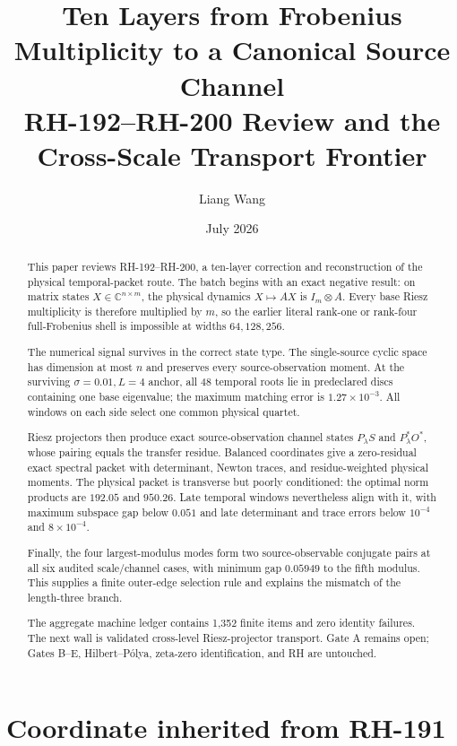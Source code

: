 \documentclass[12pt]{article}
\title{Ten Layers from Frobenius Multiplicity to a Canonical Source Channel\\
\large RH-192--RH-200 Review and the Cross-Scale Transport Frontier}
\author{Liang Wang}
\date{July 2026}
\theoremstyle{remark}
\begin{document}
\maketitle

\begin{abstract}
This paper reviews RH-192--RH-200, a ten-layer correction and reconstruction
of the physical temporal-packet route.  The batch begins with an exact
negative result: on matrix states $X\in\mathbb C^{n\times m}$, the physical
dynamics $X\mapsto AX$ is $I_m\otimes A$.  Every base Riesz multiplicity is
therefore multiplied by $m$, so the earlier literal rank-one or rank-four
full-Frobenius shell is impossible at widths $64,128,256$.

The numerical signal survives in the correct state type.  The single-source
cyclic space has dimension at most $n$ and preserves every
source-observation moment.  At the surviving $\sigma=0.01,L=4$ anchor, all
48 temporal roots lie in predeclared discs containing one base eigenvalue;
the maximum matching error is $1.27\times10^{-3}$.  All windows on each side
select one common physical quartet.

Riesz projectors then produce exact source-observation channel states
$P_\lambda S$ and $P_\lambda^*O^*$, whose pairing equals the transfer
residue.  Balanced coordinates give a zero-residual exact spectral packet
with determinant, Newton traces, and residue-weighted physical moments.
The physical packet is transverse but poorly conditioned: the optimal norm
products are $192.05$ and $950.26$.  Late temporal windows nevertheless
align with it, with maximum subspace gap below $0.051$ and late determinant
and trace errors below $10^{-4}$ and $8\times10^{-4}$.

Finally, the four largest-modulus modes form two source-observable conjugate
pairs at all six audited scale/channel cases, with minimum gap $0.05949$ to
the fifth modulus.  This supplies a finite outer-edge selection rule and
explains the mismatch of the length-three branch.

The aggregate machine ledger contains 1,352 finite items and zero identity
failures.  The next wall is validated cross-level Riesz-projector transport.
Gate A remains open; Gates B--E, Hilbert--P\'olya, zeta-zero identification,
and RH are untouched.
\end{abstract}

\section{Coordinate inherited from RH-191}
\end{document}
